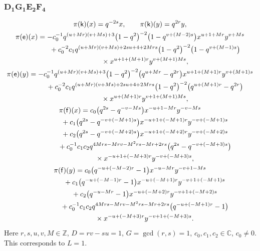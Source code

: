 \documentclass[pdftex]{sigma}
\numberwithin{equation}{section}
\begin{document}
\subsubsection*{$\boldsymbol{D_1G_1E_2F_4}$}
\begin{gather*}
\pi(\mathsf{k})(x)= q^{-2s}x ,\qquad\pi(\mathsf{k})(y)=q^{2r}y ,\\
\pi(\mathsf{e})(x)= -c_0^{-1}q^{(u+Mr)(v+Ms)+3}\big(1-q^2\big)^{-2}\big(1-q^{v+(M-2)s}\big)x^{u+1+Mr}y^{v+Ms}\\
\hphantom{\pi(\mathsf{e})(x)=}{}+ c_0^{-2}c_1q^{(u+Mr)(v+Ms)+2su+4+2Mrs}\big(1-q^2\big)^{-2}\big(1-q^{v+(M-1)s}\big)\\
\hphantom{\pi(\mathsf{e})(x)=}{}\times x^{u+1+(M+1)r}y^{v+(M+1)Ms} ,\\
\pi(\mathsf{e})(y)= -c_0^{-1}q^{(u+Mr)(v+Ms)+3}\big(1-q^2\big)^{-2}\big(q^{u+Mr}-q^{2r}\big)x^{u+1+(M+1)r}y^{v+(M+1)s}\\
\hphantom{\pi(\mathsf{e})(y)=}{}+ c_0^{-2}c_1q^{(u+Mr)(v+Ms)+2su+4+2Mrs}\big(1-q^2\big)^{-2}\big(q^{u+(M+1)r}-q^{2r}\big)\\
\hphantom{\pi(\mathsf{e})(y)=}{}\times x^{u+(M+1)r}y^{v+1+(M+1)Ms} ,\\
\pi(\mathsf{f})(x)= c_0\big(q^{2s}-q^{-v-Ms}\big)x^{-u+1-Mr}y^{-v-Ms}\\
\hphantom{\pi(\mathsf{f})(x)=}{}+ c_1\big(q^{2s}-q^{-v+(-M+1)s}\big)x^{-u+1+(-M+1)r}y^{-v+(-M+1)s}\\
\hphantom{\pi(\mathsf{f})(x)=}{}+ c_2\big(q^{2s}-q^{-v+(-M+2)s}\big)x^{-u+1+(-M+2)r}y^{-v+(-M+2)s}\\
\hphantom{\pi(\mathsf{f})(x)=}{}+ c_0^{-1}c_1c_2q^{4Mrs-Mrv-M^2rs-Mr+2rs}\big(q^{2s}-q^{-v+(-M+3)s}\big)\\
\hphantom{\pi(\mathsf{f})(x)=}{}\times x^{-u+1+(-M+3)r}y^{-v+(-M+3)s} ,\\
\pi(\mathsf{f})(y)= c_0\big(q^{-u+(-M-2)r}-1\big)x^{-u-Mr}y^{-v+1-Ms}\\
\hphantom{\pi(\mathsf{f})(y)=}{} + c_1\big(q^{-u+(-M-1)r}-1\big)x^{-u+(-M+1)r}y^{-v+1+(-M+1)s}\\
\hphantom{\pi(\mathsf{f})(y)=}{} + c_2\big(q^{-u-Mr}-1\big)x^{-u+(-M+2)r}y^{-v+1+(-M+2)s}\\
\hphantom{\pi(\mathsf{f})(y)=}{} + c_0^{-1}c_1c_2q^{4Mrs-Mrv-M^2rs-Mr+2rs}\big(q^{-u+(-M+1)r}-1\big)\\
\hphantom{\pi(\mathsf{f})(y)=}{}\times x^{-u+(-M+3)r}y^{-v+1+(-M+3)s} .
\end{gather*}
Here $r,s,u,v,M\in\mathbb{Z}$, $D=rv-su=1$, $G=\operatorname{gcd}(r,s)=1$, $c_0,c_1,c_2\in\mathbb{C}$, $c_0\ne 0$. This corresponds to $L=1$.
\end{document}
